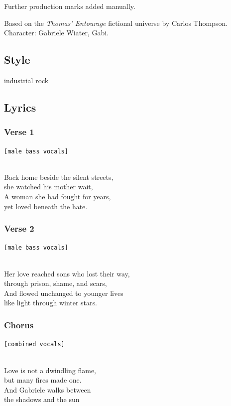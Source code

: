 Further production marks added manually.

Based on the \emph{Thomas' Entourage} fictional universe by Carlos
Thompson.\\
Character: Gabriele Wiater, Gabi.

\subsection{Style}\label{style-10}

industrial rock

\subsection{Lyrics}\label{lyrics-10}

\subsubsection{Verse 1}\label{verse-1-7}

\texttt{{[}male\ bass\ vocals{]}}\strut \\
Back home beside the silent streets,\\
she watched his mother wait,\\
A woman she had fought for years,\\
yet loved beneath the hate.

\subsubsection{Verse 2}\label{verse-2-7}

\texttt{{[}male\ bass\ vocals{]}}\strut \\
Her love reached sons who lost their way,\\
through prison, shame, and scars,\\
And flowed unchanged to younger lives\\
like light through winter stars.

\subsubsection{Chorus}\label{chorus-20}

\texttt{{[}combined\ vocals{]}}\strut \\
Love is not a dwindling flame,\\
but many fires made one.\\
And Gabriele walks between\\
the shadows and the sun

